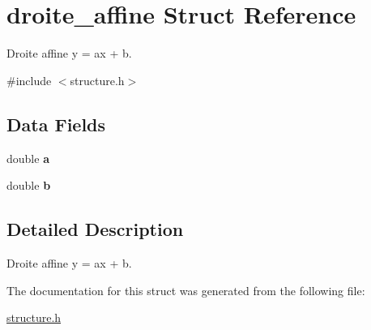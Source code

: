 \hypertarget{structdroite__affine}{}\section{droite\+\_\+affine Struct Reference}
\label{structdroite__affine}


Droite affine y = ax + b.  




{\ttfamily \#include $<$structure.\+h$>$}

\subsection*{Data Fields}
\begin{DoxyCompactItemize}
\item 
double {\bfseries a}\hypertarget{structdroite__affine_a58e3d14ed9394e3ac0101acff8e9f8da}{}\label{structdroite__affine_a58e3d14ed9394e3ac0101acff8e9f8da}

\item 
double {\bfseries b}\hypertarget{structdroite__affine_a60b11994f08ae230ba4ed1f49bd26510}{}\label{structdroite__affine_a60b11994f08ae230ba4ed1f49bd26510}

\end{DoxyCompactItemize}


\subsection{Detailed Description}
Droite affine y = ax + b. 

The documentation for this struct was generated from the following file\+:\begin{DoxyCompactItemize}
\item 
\hyperlink{structure_8h}{structure.\+h}\end{DoxyCompactItemize}

